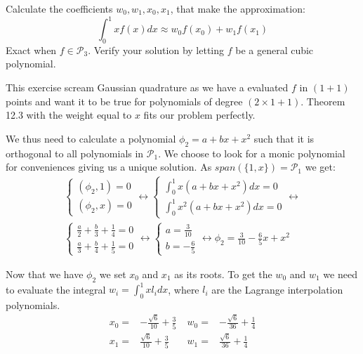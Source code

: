 \begin{problem}
Calculate the coefficients $w_0, w_1, x_0, x_1$, that make the
approximation:
\begin{equation*}
  \int_0^1 x f(x) dx \approx w_0 f(x_0) + w_1 f(x_1)
\end{equation*}
Exact when $f \in \mathcal{P}_3$. Verify your solution by letting $f$
be a general cubic polynomial. 
\end{problem}

\begin{solution}
  This exercise scream Gaussian quadrature as we have a evaluated $f$
  in $(1 + 1)$ points and want it to be true for polynomials of degree
  $(2 \times 1 + 1)$. Theorem 12.3 with the weight equal
  to $x$ fits our problem perfectly.

  We thus need to calculate a polynomial $\phi_2 = a + bx + x^2$
  such that it is orthogonal to all polynomials in $\mathcal{P}_1$. We
  choose to look for a monic polynomial for conveniences giving us a
  unique solution. As $span(\{1, x\}) = \mathcal{P}_1$ we get:
  \begin{align*}
    \begin{cases}
      (\phi_2, 1) = 0 \\
      (\phi_2, x) = 0
    \end{cases}
    \leftrightarrow
    \begin{cases}
      \int_0^1 x (a + bx + x^2) dx = 0 \\
      \int_0^1 x^2(a + bx + x^2) dx = 0
    \end{cases} \leftrightarrow \\    
    \begin{cases}
      \frac{a}{2} + \frac{b}{3} + \frac{1}{4} = 0 \\
      \frac{a}{3} + \frac{b}{4} + \frac{1}{5} = 0
    \end{cases}  \leftrightarrow
    \begin{cases}
      a = \frac{3}{10} \\
      b = - \frac{6}{5}
    \end{cases} \leftrightarrow
    \phi_2 = \frac{3}{10} - \frac{6}{5}x + x^2
  \end{align*}

  Now that we have $\phi_2$ we set $x_0$ and $x_1$ as its roots. To
  get the $w_0$ and $w_1$ we need to evaluate the integral
  $w_i = \int_0^1 x l_i dx$, where $l_i$ are the Lagrange
  interpolation polynomials.
  \begin{align*}
    x_0 = &- \frac{\sqrt{6}}{10} + \frac{3}{5} \; & 
    w_0 = &- \frac{\sqrt{6}}{36} + \frac{1}{4}  \\
    x_1 = &\frac{\sqrt{6}}{10} + \frac{3}{5} \; &
    w_1 = & \frac{\sqrt{6}}{36} + \frac{1}{4}
  \end{align*}
  

\end{solution}
